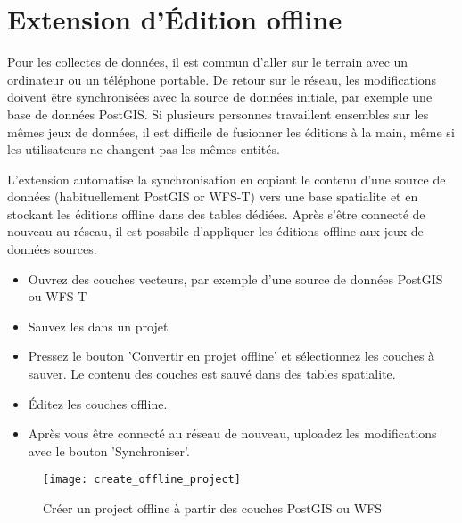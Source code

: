 
\section{Extension d'Édition offline}\label{sec:offlinedit}


Pour les collectes de données, il est commun d'aller sur le terrain avec un ordinateur ou 
un téléphone portable. De retour sur le réseau, les modifications doivent être 
synchronisées avec la source de données initiale, par exemple une base de données PostGIS. 
Si plusieurs personnes travaillent ensembles sur les mêmes jeux de données, il est difficile 
de fusionner les éditions à la main, même si les utilisateurs ne changent pas les mêmes 
entités.

L'extension  automatise la synchronisation 
en copiant le contenu d'une source de données (habituellement PostGIS or WFS-T) vers une 
base spatialite et en stockant les éditions offline dans des tables dédiées. Après s'être 
connecté de nouveau au réseau, il est possbile d'appliquer les éditions offline aux jeux de 
données sources.


\begin{itemize}
\item Ouvrez des couches vecteurs, par exemple d'une source de données PostGIS ou WFS-T
\item Sauvez les dans un projet
\item Pressez le bouton 'Convertir en projet offline' et sélectionnez les couches à 
sauver. Le contenu des couches est sauvé dans des tables spatialite. 
\item Éditez les couches offline.
\item Après vous être connecté au réseau de nouveau, uploadez les modifications 
avec le bouton 'Synchroniser'.
\end{itemize}

\begin{figure}[ht]
   \centering
   \texttt{[image: create\_offline\_project]}   
   \caption{Créer un project offline à partir des couches PostGIS ou WFS \nixcaption}
   \label{fig:offlineproject}
\end{figure}

\FloatBarrier

